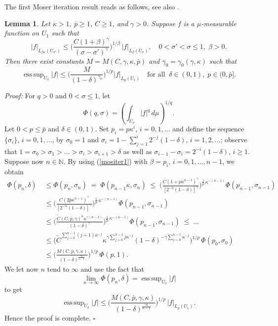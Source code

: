 \documentclass[10pt]{article}
\newtheorem{lemma}{Lemma}[section]
\newcommand{\iN}{\mathbb{N}}
\DeclareMathOperator*{\esup}{ess\,sup}
\begin{document}
The first Moser iteration result reads as follows, see also
\cite[Lemma 2.3]{CZ}.
\begin{lemma} \label{moserit1}
Let $\kappa>1$, $\bar{p}\ge 1$, $C\ge 1$, and $\gamma>0$. Suppose
$f$ is a $\mu$-measurable function on $U_1$ such that
\begin{equation} \label{mositer1}
|f|_{L_{\beta\kappa}(U_{\sigma'})}\le
\Big(\frac{C(1+\beta)^{\gamma}}{(\sigma-\sigma')^{\gamma}}\Big)^{1/\beta}\,|f|_{L_{\beta}(U_{\sigma})},
\quad 0<\sigma'<\sigma\le 1,\;\beta>0.
\end{equation}
Then there exist constants $M=M(C,\gamma,\kappa,\bar{p})$ and
$\gamma_0=\gamma_0(\gamma,\kappa)$ such that
\[
\esup_{U_{\delta}}{|f|} \le
\Big(\frac{M}{(1-\delta)^{\gamma_0}}\Big)^{1/p}
|f|_{L_{p}(U_1)}\quad \mbox{for all}\;\;\delta\in(0,1),\;p\in
(0,\bar{p}] .\]
\end{lemma}
{\em Proof:} For $q>0$ and $0<\sigma\le 1$, let
\[ \Phi(q,\sigma)=(\int_{U_\sigma} |f|^q\,d\mu)^{1/q}.\]
Let $0<p\le \bar{p}$ and $\delta\in (0,1)$. Set $p_i=p\kappa^{i}$,
$i=0,1,\ldots$ and define the sequence $\{\sigma_i\}$,
$i=0,1,\ldots$, by $\sigma_0=1$ and $\sigma_i=1-\sum_{j=1}^i 2^{-j}
(1-\delta)$, $i=1,2,\ldots$; observe that
$1=\sigma_0>\sigma_1>\ldots>\sigma_i>\sigma_{i+1}>\delta$ as well as
$\sigma_{i-1}-\sigma_{i}=2^{-i}(1-\delta)$, $i\ge 1$. Suppose now
$n\in \iN$. By using (\ref{mositer1}) with $\beta=p_i$,
$i=0,1,\ldots,n-1$, we obtain
\begin{align*}
\Phi(p_n,\delta)& \;\le
\Phi(p_n,\sigma_n)\;=\;\Phi(p_{n-1}\kappa,\sigma_n)\;\le\;
\Big(\frac{C(1+p\kappa^{n-1})^{\gamma}}{[2^{-n}(1-\delta)]^{\gamma}}\Big)^
{\frac{1}{p}\,\kappa^{-(n-1)}}\Phi(p_{n-1},\sigma_{n-1})\\ & \;\le
\Big(\frac{C(2\bar{p}\kappa^{n-1})^{\gamma}}{[2^{-n}(1-\delta)]^{\gamma}}\Big)^
{\frac{1}{p}\,\kappa^{-(n-1)}}\Phi(p_{n-1},\sigma_{n-1})\\ &\;\le
\Big(\frac{\tilde{C}(C,\bar{p},\gamma)^n
\kappa^{\gamma(n-1)}}{(1-\delta)^{\gamma}}\Big)^
{\frac{1}{p}\,\kappa^{-(n-1)}}\Phi(p_{n-1},\sigma_{n-1})\;\le\;\ldots\\
& \;\le \Big(\tilde{C}^{\sum_{j=0}^{n-1}
(j+1)\kappa^{-j}}\kappa^{\gamma\sum_{j=0}^{n-1}
j\kappa^{-j}}(1-\delta)^{-\gamma\sum_{j=0}^{n-1}
\kappa^{-j}}\Big)^{1/p}\,\Phi(p_0,\sigma_0)\\ & \; \le
\Big(\frac{M(C,\bar{p},\gamma,\kappa)}{(1-\delta)^{\frac{\gamma\kappa}{\kappa-1}}}\Big)^
{1/p}\,\Phi(p,1).
\end{align*}
We let now $n$ tend to $\infty$ and use the fact that
\[ \lim_{n\to\infty}\Phi(p_n,\delta)=\esup_{U_{\delta}}{|f|}\]
to get
\[ \esup_{U_{\delta}}{|f|} \le
\Big(\frac{M(C,\bar{p},\gamma,\kappa)}{(1-\delta)^{\frac{\gamma\kappa}{\kappa-1}}}\Big)^
{1/p}\,|f|_{L_{p}(U_1)}.\] Hence the proof is complete. $\square$
\end{document}
